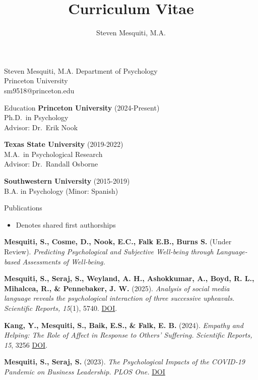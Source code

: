 \documentclass[
  11pt,
  ignorenonframetext,
]{beamer}
\title{Curriculum Vitae}
\author{Steven Mesquiti, M.A.}
\date{}
\providecommand{\tightlist}{%
  \setlength{\itemsep}{0pt}\setlength{\parskip}{0pt}}\usepackage{longtable,booktabs,array}
\begin{document}
\frame{\titlepage}


\begin{frame}{Steven Mesquiti, M.A.}
\label{steven-mesquiti-m.a.}
Department of Psychology\\
Princeton University\\
sm9518@princeton.edu
\end{frame}

\begin{frame}
\begin{block}{Education}
\label{education}
\textbf{Princeton University} (2024-Present)\\
Ph.D.~in Psychology\\
Advisor: Dr.~Erik Nook

\textbf{Texas State University} (2019-2022)\\
M.A.~in Psychological Research\\
Advisor: Dr.~Randall Osborne

\textbf{Southwestern University} (2015-2019)\\
B.A. in Psychology (Minor: Spanish)
\end{block}
\end{frame}

\begin{frame}
\begin{block}{Publications}
\label{publications}
\begin{itemize}
\tightlist
\item
  Denotes shared first authorships
\end{itemize}

\textbf{Mesquiti, S., Cosme, D., Nook, E.C., Falk E.B., Burns S.} (Under
Review). \emph{Predicting Psychological and Subjective Well-being
through Language-based Assessments of Well-being.}

\textbf{Mesquiti, S., Seraj, S., Weyland, A. H., Ashokkumar, A., Boyd,
R. L., Mihalcea, R., \& Pennebaker, J. W.} (2025). \emph{Analysis of
social media language reveals the psychological interaction of three
successive upheavals.} \emph{Scientific Reports, 15}(1), 5740.
\href{https://doi.org/10.1038/s41598-025-89165-z}{DOI}.

\textbf{Kang, Y., Mesquiti, S., Baik, E.S., \& Falk, E. B.} (2024).
\emph{Empathy and Helping: The Role of Affect in Response to Others'
Suffering.} \emph{Scientific Reports, 15}, 3256
\href{https://doi.org/10.1038/s41598-025-87221-2}{DOI}.

\textbf{Mesquiti, S., Seraj, S.} (2023). \emph{The Psychological Impacts
of the COVID-19 Pandemic on Business Leadership.} \emph{PLOS One.}
\href{https://doi.org/10.1371/journal.pone.0290621}{DOI}
\end{block}
\end{frame}
\end{document}
